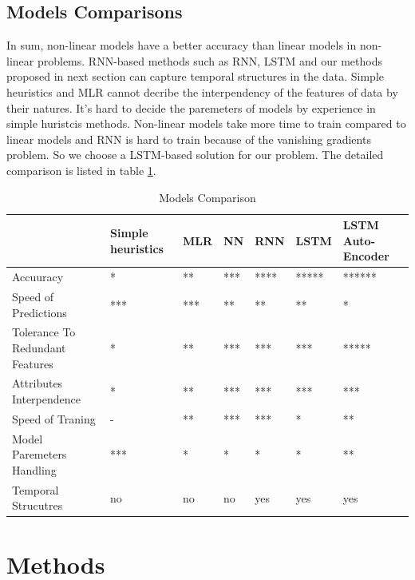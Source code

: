\documentclass[5p]{elsarticle}
\begin{document}
\subsection{Models Comparisons}
In sum, non-linear models have a better accuracy than linear models in non-linear problems. RNN-based methods such as RNN, LSTM and our methods proposed in next section can capture temporal structures in the data. Simple heuristics and MLR cannot decribe the interpendency of the features of data by their natures. It's hard to decide the paremeters of models by experience in simple huristcis methods. Non-linear models take more time to train compared to linear models and RNN is hard to train because of the vanishing gradients problem. So we choose a LSTM-based solution for our problem. The detailed comparison is listed in table \ref{models_comparison}.

\begin{table}[]
\centering
\caption{Models Comparison}
\label{models_comparison}
\begin{tabular}{|l|l|l|l|l|l|l|}
\hline
 & Simple heuristics & MLR & NN   & RNN   & LSTM  & LSTM Auto-Encoder \\
\hline
Accuuracy                       & *                & **                         & ***   & ****  & ***** & ******            \\
\hline
Speed of Predictions            & ***           & ***                     & **   & **   & **   & *                \\
\hline
Tolerance To Redundant Features & *                & **                         & *** & *** & *** & *****           \\
\hline 
Attributes Interpendence        & *                & **                        & *** & *** & *** & ***             \\
\hline
Speed of Traning                & -                & **                       & ***   & ***   & *    & **                 \\
\hline
Model Paremeters Handling       & ***              & *                          & *     & *     & *     & **                \\
\hline
Temporal Strucutres             & no               & no                         & no    & yes   & yes   & yes\\
\hline
\end{tabular}
\end{table}

\section{Methods}
\end{document}
